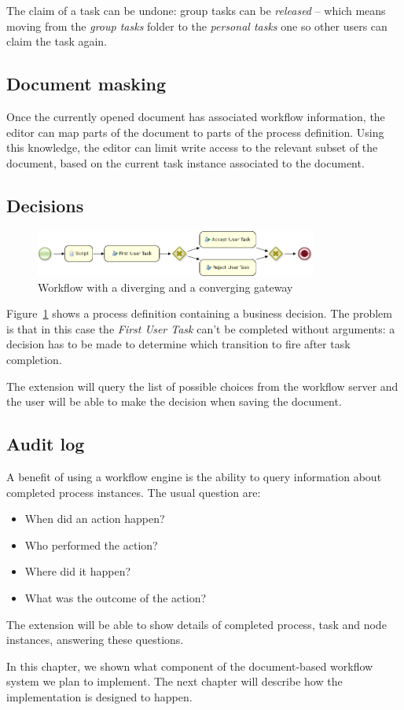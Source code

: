 The claim of a task can be undone: group tasks can be \emph{released} -- which
means moving from the \emph{group tasks} folder to the \emph{personal tasks}
one so other users can claim the task again.

\subsection*{Document masking}

Once the currently opened document has associated workflow information, the
editor can map parts of the document to parts of the process definition. Using
this knowledge, the editor can limit write access to the relevant subset of the
document, based on the current task instance associated to the document.

\subsection*{Decisions}

\begin{figure}[H]
\centering
\includegraphics[width=350px,keepaspectratio]{decision-bpmn.png}
\caption{Workflow with a diverging and a converging gateway}
\label{fig:decision-bpmn}
\end{figure}

Figure~\ref{fig:decision-bpmn} shows a process definition containing a business
decision. The problem is that in this case the \emph{First User Task} can't be
completed without arguments: a decision has to be made to determine which
transition to fire after task completion.

The extension will query the list of possible choices from the workflow server
and the user will be able to make the decision when saving the document.

\subsection*{Audit log}

A benefit of using a workflow engine is the ability to query information about
completed process instances. The usual question are:

\begin{itemize}
\item When did an action happen?
\item Who performed the action?
\item Where did it happen?
\item What was the outcome of the action?
\end{itemize}

The extension will be able to show details of completed process, task and node
instances, answering these questions.

In this chapter, we shown what component of the document-based workflow system we
plan to implement. The next chapter will describe how the implementation is
designed to happen.
